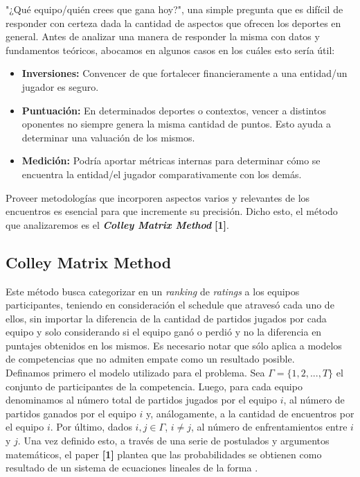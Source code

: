 "¿Qu\'e equipo/qui\'en crees que gana hoy?", una simple pregunta que es dif\'icil de responder con certeza dada la cantidad de aspectos que ofrecen los deportes en general. Antes de analizar una manera de responder la misma con datos y fundamentos te\'oricos, abocamos en algunos casos en los cuáles esto ser\'ia \'util:

\begin{itemize}
\item \textbf{Inversiones:} Convencer de que fortalecer financieramente a una entidad/un jugador es seguro.
\item \textbf{Puntuaci\'on:} En determinados deportes o contextos, vencer a distintos oponentes no siempre genera la misma cantidad de puntos. Esto ayuda a determinar una valuaci\'on de los mismos.
\item \textbf{Medici\'on:} Podr\'ia aportar m\'etricas internas para determinar c\'omo se encuentra la entidad/el jugador comparativamente con los dem\'as.
\end{itemize}

Proveer metodolog\'ias que incorporen aspectos varios y relevantes de los encuentros es esencial para que incremente su precisión. Dicho esto, el m\'etodo que analizaremos es el \textbf{\textit{Colley Matrix Method}} \textbf{[1]}.

\subsection{Colley Matrix Method}

Este m\'etodo busca categorizar en un \textit{ranking} de \textit{ratings} a los equipos participantes, teniendo en consideraci\'on el schedule que atraves\'o cada uno de ellos, sin importar la diferencia de la cantidad de partidos jugados por cada equipo y solo considerando si el equipo gan\'o o perdi\'o  y no la diferencia en puntajes obtenidos en los mismos. Es necesario notar que s\'olo aplica a modelos de competencias que no admiten empate como un resultado posible. \\

Definamos primero el modelo utilizado para el problema. Sea $\Gamma = \{1,2,...,T\}$ el conjunto de participantes de la competencia. Luego, para cada equipo  denominamos  al n\'umero total de partidos jugados por el equipo $i$,  al n\'umero de partidos ganados por el equipo $i$ y, an\'alogamente,  a la cantidad de encuentros por el equipo $i$. Por \'ultimo, dados $i, j \in \Gamma$, $i \neq j$,  al n\'umero de enfrentamientos entre $i$ y $j$. Una vez definido esto, a través de una serie de postulados y argumentos matemáticos, el paper \textbf{[1]} plantea que las probabilidades se obtienen como resultado de un sistema de ecuaciones lineales de la forma . \\

